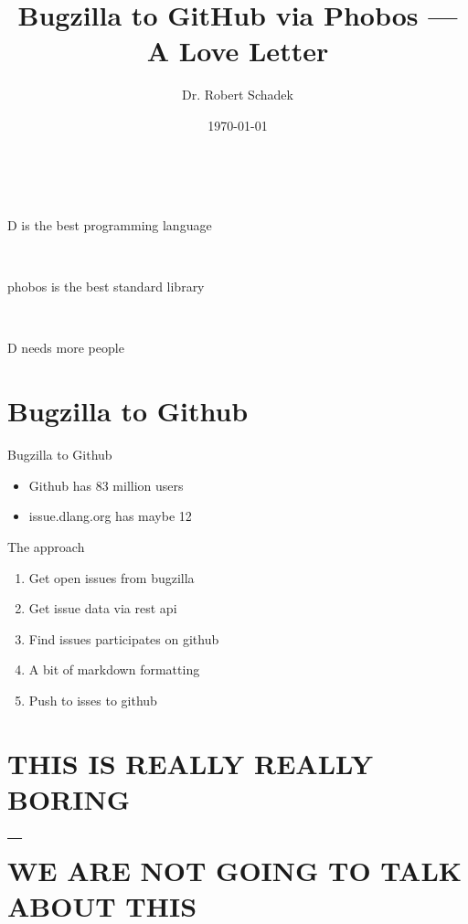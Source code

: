 \documentclass[aspectratio=169,notes]{beamer}
\title{Bugzilla to GitHub via Phobos --- A Love Letter}
\date{\today}
\author{Dr. Robert Schadek}
\begin{document}
	\maketitle

	\begin{frame}[fragile]{\,}
		\begin{center}
			{\huge D is the best programming language}
		\end{center}
	\end{frame}

	\begin{frame}[fragile]{\,}
		\begin{center}
			{\huge phobos is the best standard library}
		\end{center}
	\end{frame}

	\begin{frame}[fragile]{\,}
		\begin{center}
			{\huge D needs more people}
		\end{center}
	\end{frame}

	\section{Bugzilla to Github}
	\begin{frame}[fragile]{Bugzilla to Github}
		\Large
		\begin{itemize}
			\item Github has 83 million users
			\item issue.dlang.org has maybe 12
		\end{itemize}
	\end{frame}

	\begin{frame}[fragile]{The approach}
		\begin{enumerate}
			\item Get open issues from bugzilla
			\item Get issue data via rest api
			\item Find issues participates on github
			\item A bit of markdown formatting
			\item Push to isses to github
		\end{enumerate}
	\end{frame}

	\section{THIS IS REALLY REALLY BORING\\ --\\ WE ARE NOT GOING TO TALK ABOUT THIS}
\end{document}
